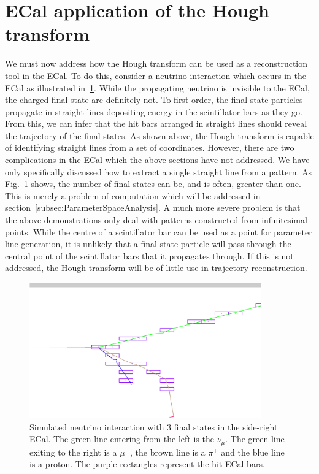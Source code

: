 \section{ECal application of the Hough transform}
\label{sec:ECalApplicationHoughTransform}
We must now address how the Hough transform can be used as a reconstruction tool in the ECal.  To do this,  consider a neutrino interaction which occurs in the ECal as illustrated in~\ref{fig:3StateInteractionNoReconstruction}.  While the propagating neutrino is invisible to the ECal, the charged final state are definitely not.  To first order, the final state particles propagate in straight lines depositing energy in the scintillator bars as they go.  From this, we can infer that the hit bars arranged in straight lines should reveal the trajectory of the final states.  As shown above, the Hough transform is capable of identifying straight lines from a set of coordinates.  However, there are two complications in the ECal which the above sections have not addressed.  We have only specifically discussed how to extract a single straight line from a pattern.  As Fig.~\ref{fig:3StateInteractionNoReconstruction} shows, the number of final states can be, and is often, greater than one.  This is merely a problem of computation which will be addressed in section~\ref{subsec:ParameterSpaceAnalysis}.  A much more severe problem is that the above demonstrations only deal with patterns constructed from infinitesimal points.  While the centre of a scintillator bar can be used as a point for parameter line generation, it is unlikely that a final state particle will pass through the central point of the scintillator bars that it propagates through.  If this is not addressed, the Hough transform will be of little use in trajectory reconstruction.
\begin{figure}
  \centering
  \includegraphics[width=10cm]{images/hough_transform/3StateInteraction_SideLeftECal_NoReconstruction.eps}
  \caption{Simulated neutrino interaction with 3 final states in the side-right ECal.  The green line entering from the left is the $\nu_\mu$.  The green line exiting to the right is a $\mu^{-}$, the brown line is a $\pi^+$ and the blue line is a proton.  The purple rectangles represent the hit ECal bars.}
  \label{fig:3StateInteractionNoReconstruction}
\end{figure}

